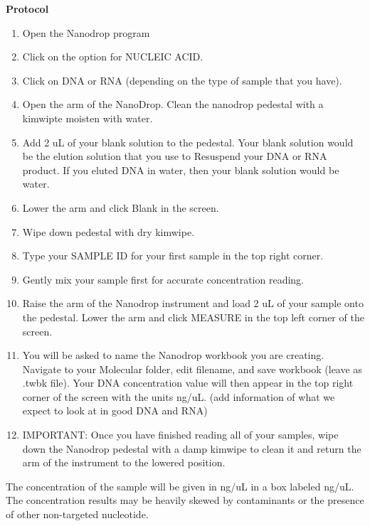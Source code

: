 \documentclass[11pt, oneside]{article}
\begin{document}
		{\bf Protocol}	
		\begin{enumerate}
			\itemsep0em
			\item Open the Nanodrop program
			\item Click on the option for NUCLEIC ACID.
			\item Click on DNA or RNA (depending on the type of sample that you have).
			\item Open the arm of the NanoDrop. Clean the nanodrop pedestal with a kimwipte moisten with water. 
			\item Add 2 uL of your blank solution to the pedestal. Your blank solution would be the elution solution that you use to Resuspend your DNA or 			RNA 	product. If you eluted DNA in water, then your blank solution would be water. 
			\item Lower the arm and click Blank in the screen. 
			\item Wipe down pedestal with dry kimwipe.
			\item Type your SAMPLE ID for your first sample in the top right corner.
			\item Gently mix your sample first for accurate concentration reading.
			\item Raise the arm of the Nanodrop instrument and load 2 uL of your sample onto the pedestal. Lower the arm and click MEASURE in the 			top left corner of the screen.
			\item You will be asked to name the Nanodrop workbook you are creating. Navigate to your Molecular folder, edit filename, and save 				workbook 	(leave as .twbk file). Your DNA concentration value will then appear in the top right corner of the screen with the units ng/uL. (add 			information of what we expect to look at in good DNA and RNA) 
			\item IMPORTANT: Once you have finished reading all of your samples, wipe down the Nanodrop pedestal with a damp kimwipe to clean it 			and return the arm of the instrument to the lowered position.
		\end{enumerate}

		\vspace{5mm}

	
		\noindent The concentration of the sample will be given in ng/uL in a box labeled ng/uL. The concentration results may be heavily skewed by 			contaminants or the presence of other non-targeted nucleotide. 
	
		\vspace{5mm}
	
\end{document}
